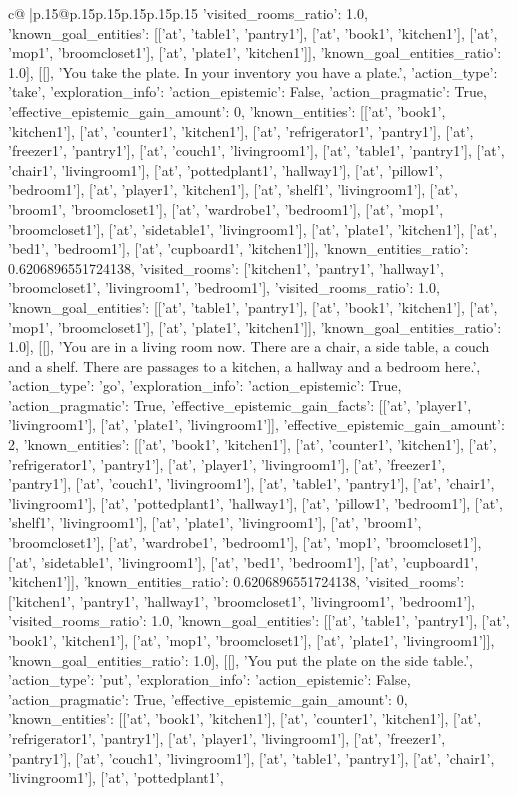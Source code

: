 \documentclass{article}
\begin{document}
{\begin{supertabular}{c@{$\;$}|p{.15\linewidth}@{}p{.15\linewidth}p{.15\linewidth}p{.15\linewidth}p{.15\linewidth}p{.15\linewidth}}
{{{'visited_rooms_ratio': 1.0, 'known_goal_entities': [['at', 'table1', 'pantry1'], ['at', 'book1', 'kitchen1'], ['at', 'mop1', 'broomcloset1'], ['at', 'plate1', 'kitchen1']], 'known_goal_entities_ratio': 1.0}}], [[], 'You take the plate. In your inventory you have a plate.', {'action_type': 'take', 'exploration_info': {'action_epistemic': False, 'action_pragmatic': True, 'effective_epistemic_gain_amount': 0, 'known_entities': [['at', 'book1', 'kitchen1'], ['at', 'counter1', 'kitchen1'], ['at', 'refrigerator1', 'pantry1'], ['at', 'freezer1', 'pantry1'], ['at', 'couch1', 'livingroom1'], ['at', 'table1', 'pantry1'], ['at', 'chair1', 'livingroom1'], ['at', 'pottedplant1', 'hallway1'], ['at', 'pillow1', 'bedroom1'], ['at', 'player1', 'kitchen1'], ['at', 'shelf1', 'livingroom1'], ['at', 'broom1', 'broomcloset1'], ['at', 'wardrobe1', 'bedroom1'], ['at', 'mop1', 'broomcloset1'], ['at', 'sidetable1', 'livingroom1'], ['at', 'plate1', 'kitchen1'], ['at', 'bed1', 'bedroom1'], ['at', 'cupboard1', 'kitchen1']], 'known_entities_ratio': 0.6206896551724138, 'visited_rooms': ['kitchen1', 'pantry1', 'hallway1', 'broomcloset1', 'livingroom1', 'bedroom1'], 'visited_rooms_ratio': 1.0, 'known_goal_entities': [['at', 'table1', 'pantry1'], ['at', 'book1', 'kitchen1'], ['at', 'mop1', 'broomcloset1'], ['at', 'plate1', 'kitchen1']], 'known_goal_entities_ratio': 1.0}}], [[], 'You are in a living room now. There are a chair, a side table, a couch and a shelf. There are passages to a kitchen, a hallway and a bedroom here.', {'action_type': 'go', 'exploration_info': {'action_epistemic': True, 'action_pragmatic': True, 'effective_epistemic_gain_facts': [['at', 'player1', 'livingroom1'], ['at', 'plate1', 'livingroom1']], 'effective_epistemic_gain_amount': 2, 'known_entities': [['at', 'book1', 'kitchen1'], ['at', 'counter1', 'kitchen1'], ['at', 'refrigerator1', 'pantry1'], ['at', 'player1', 'livingroom1'], ['at', 'freezer1', 'pantry1'], ['at', 'couch1', 'livingroom1'], ['at', 'table1', 'pantry1'], ['at', 'chair1', 'livingroom1'], ['at', 'pottedplant1', 'hallway1'], ['at', 'pillow1', 'bedroom1'], ['at', 'shelf1', 'livingroom1'], ['at', 'plate1', 'livingroom1'], ['at', 'broom1', 'broomcloset1'], ['at', 'wardrobe1', 'bedroom1'], ['at', 'mop1', 'broomcloset1'], ['at', 'sidetable1', 'livingroom1'], ['at', 'bed1', 'bedroom1'], ['at', 'cupboard1', 'kitchen1']], 'known_entities_ratio': 0.6206896551724138, 'visited_rooms': ['kitchen1', 'pantry1', 'hallway1', 'broomcloset1', 'livingroom1', 'bedroom1'], 'visited_rooms_ratio': 1.0, 'known_goal_entities': [['at', 'table1', 'pantry1'], ['at', 'book1', 'kitchen1'], ['at', 'mop1', 'broomcloset1'], ['at', 'plate1', 'livingroom1']], 'known_goal_entities_ratio': 1.0}}], [[], 'You put the plate on the side table.', {'action_type': 'put', 'exploration_info': {'action_epistemic': False, 'action_pragmatic': True, 'effective_epistemic_gain_amount': 0, 'known_entities': [['at', 'book1', 'kitchen1'], ['at', 'counter1', 'kitchen1'], ['at', 'refrigerator1', 'pantry1'], ['at', 'player1', 'livingroom1'], ['at', 'freezer1', 'pantry1'], ['at', 'couch1', 'livingroom1'], ['at', 'table1', 'pantry1'], ['at', 'chair1', 'livingroom1'], ['at', 'pottedplant1', }}}
\end{supertabular}}
\end{document}
